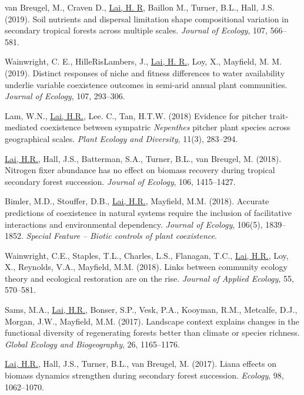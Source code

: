 \documentclass[a4paper]{article}
\begin{document}
\hangindent=1cm van Breugel, M., Craven D., \underline{Lai, H. R}, Baillon M., Turner, B.L., Hall, J.S. (2019). Soil nutrients and dispersal limitation shape compositional variation in secondary tropical forests across multiple scales. \textit{Journal of Ecology}, 107, 566--581.

\hangindent=1cm Wainwright, C. E., HilleRisLambers, J., \underline{Lai, H. R.}, Loy, X., Mayfield, M. M. (2019). Distinct responses of niche and fitness differences to water availability underlie variable coexistence outcomes in semi-arid annual plant communities. \textit{Journal of Ecology}, 107, 293--306.

\hangindent=1cm Lam, W.N., \underline{Lai, H.R.}, Lee. C., Tan, H.T.W. (2018) Evidence for pitcher trait-mediated coexistence between sympatric \textit{Nepenthes} pitcher plant species across geographical scales. \textit{Plant Ecology and Diversity}, 11(3), 283--294.

\hangindent=1cm \underline{Lai, H.R.}, Hall, J.S., Batterman, S.A., Turner, B.L., van Breugel, M. (2018). Nitrogen fixer abundance has no effect on biomass recovery during tropical secondary forest succession. \textit{Journal of Ecology}, 106, 1415--1427.

\hangindent=1cm Bimler, M.D., Stouffer, D.B., \underline{Lai, H.R.}, Mayfield, M.M. (2018). Accurate predictions of coexistence in natural systems require the inclusion of facilitative interactions and environmental dependency. \textit{Journal of Ecology}, 106(5), 1839--1852. \textit{Special Feature -- Biotic controls of plant coexistence}.

\hangindent=1cm Wainwright, C.E., Staples, T.L., Charles, L.S., Flanagan, T.C., \underline{Lai, H.R.}, Loy, X., Reynolds, V.A., Mayfield, M.M. (2018). Links between community ecology theory and ecological restoration are on the rise. \textit{Journal of Applied Ecology}, 55, 570--581.

\hangindent=1cm Sams, M.A., \underline{Lai, H.R.}, Bonser, S.P., Vesk, P.A., Kooyman, R.M., Metcalfe, D.J., Morgan, J.W., Mayfield, M.M. (2017). Landscape context explains changes in the functional diversity of regenerating forests better than climate or species richness. \textit{Global Ecology and Biogeography}, 26, 1165--1176.

\hangindent=1cm \underline{Lai, H.R.}, Hall, J.S., Turner, B.L., van Breugel, M. (2017). Liana effects on biomass dynamics strengthen during secondary forest succession. \textit{Ecology}, 98, 1062--1070.
\end{document}
